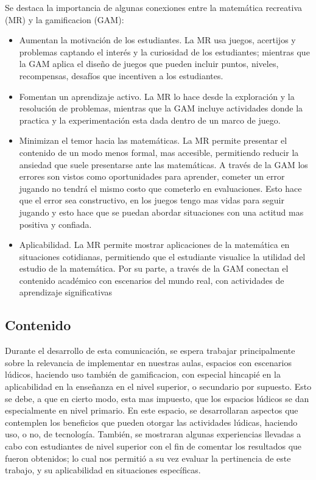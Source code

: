 Se destaca la importancia de algunas conexiones entre la matemática recreativa (MR) y la gamificacion (GAM):
\begin{itemize}
	\item Aumentan la motivación de los estudiantes. La MR usa juegos, acertijos y problemas captando el interés y la curiosidad de los estudiantes; mientras que la GAM aplica el diseño de juegos que pueden incluir puntos, niveles, recompensas,	desafíos que incentiven a los estudiantes.
	\item Fomentan un aprendizaje activo. La MR lo hace desde la exploración y la resolución de problemas, mientras que la GAM incluye actividades donde la practica y la experimentación esta dada dentro de un marco de juego.
	\item Minimizan el temor hacia las matemáticas. La MR permite presentar el contenido de un modo menos formal, mas accesible, permitiendo reducir la ansiedad que suele presentarse ante las matemáticas. A través de la GAM los errores son vistos como oportunidades para aprender, cometer un error jugando no tendrá el mismo costo que cometerlo en evaluaciones. Esto hace que el error sea constructivo, en los juegos tengo mas vidas para seguir jugando y esto hace que se puedan abordar situaciones con una actitud mas positiva y confiada.
	\item Aplicabilidad. La MR permite mostrar aplicaciones de la matemática en situaciones cotidianas, permitiendo que el estudiante visualice la utilidad del estudio de la matemática. Por su parte, a través de la GAM conectan el contenido académico con escenarios del mundo real, con actividades de aprendizaje significativas
\end{itemize}

\subsection{Contenido}

Durante el desarrollo de esta comunicación, se espera trabajar principalmente sobre la relevancia de implementar en nuestras aulas, espacios con escenarios lúdicos, haciendo uso también de gamificacion, con especial hincapié en la aplicabilidad en la enseñanza en el nivel superior, o secundario por supuesto. Esto se debe, a que en cierto modo, esta mas impuesto, que los espacios lúdicos se dan especialmente en nivel primario. En este espacio, se desarrollaran aspectos que contemplen los beneficios que pueden otorgar las actividades lúdicas, haciendo uso, o no, de tecnología. También, se mostraran algunas experiencias llevadas a cabo con estudiantes de nivel superior con el fin de comentar los resultados que fueron obtenidos; lo cual nos permitió a su vez evaluar la pertinencia de este trabajo, y su aplicabilidad en situaciones específicas.

